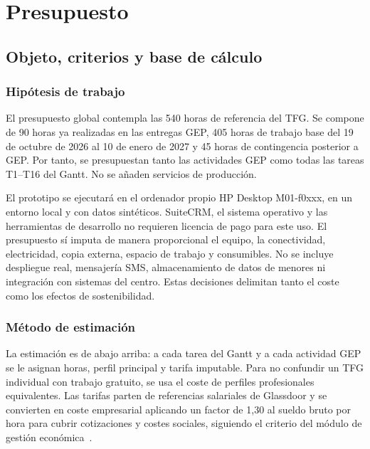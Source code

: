 
\chapter{Presupuesto}\label{sec:3}

\section{Objeto, criterios y base de cálculo}\label{sec:3-1}

\subsection{Hipótesis de trabajo}\label{sec:3-1-1}

El presupuesto global contempla las 540 horas de referencia del TFG. Se compone de 90 horas ya realizadas en las entregas GEP, 405 horas de trabajo base del 19 de octubre de 2026 al 10 de enero de 2027 y 45 horas de contingencia posterior a GEP. Por tanto, se presupuestan tanto las actividades GEP como todas las tareas T1–T16 del Gantt. No se añaden servicios de producción.

El prototipo se ejecutará en el ordenador propio HP Desktop M01-f0xxx, en un entorno local y con datos sintéticos. SuiteCRM, el sistema operativo y las herramientas de desarrollo no requieren licencia de pago para este uso. El presupuesto sí imputa de manera proporcional el equipo, la conectividad, electricidad, copia externa, espacio de trabajo y consumibles. No se incluye despliegue real, mensajería SMS, almacenamiento de datos de menores ni integración con sistemas del centro. Estas decisiones delimitan tanto el coste como los efectos de sostenibilidad.

\subsection{Método de estimación}\label{sec:3-1-2}

La estimación es de abajo arriba: a cada tarea del Gantt y a cada actividad GEP se le asignan horas, perfil principal y tarifa imputable. Para no confundir un TFG individual con trabajo gratuito, se usa el coste de perfiles profesionales equivalentes. Las tarifas parten de referencias salariales de Glassdoor y se convierten en coste empresarial aplicando un factor de 1,30 al sueldo bruto por hora para cubrir cotizaciones y costes sociales, siguiendo el criterio del módulo de gestión económica~\cite{ref23,ref24}.

